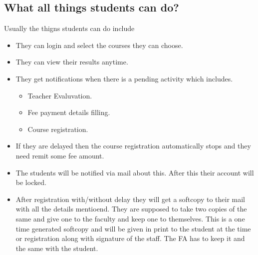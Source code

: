 \documentclass[a4paper,twoside]{article}
\begin{document}
\subsection{What all things students can do?}
Usually the thigns students can do include 
\begin{itemize}
\item They can login and select the courses they can choose.
\item They can view their results anytime.
\item They get notifications when there is a pending activity which includes.
\begin{itemize}
\item Teacher Evaluvation.
\item Fee payment details filling.
\item Course registration.
\end{itemize}
\item If they are delayed then the course registration automatically stops and they need remit some fee amount. 
\item The students will be notified via mail about this. After this their account will be locked.
\item After registration with/without delay they will get a softcopy to their mail with all the details mentioend. They are supposed to take two copies of the same and give one to the faculty and keep one to themselves. This is a one time generated softcopy and will be given in print to the student at the time or registration along with signature of the staff. The FA has to keep it and the same with the student.
\end{itemize}
\end{document}
